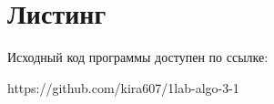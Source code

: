 \section*{Листинг}

Исходный код программы доступен по ссылке: 

https://github.com/kira607/1lab-algo-3-1